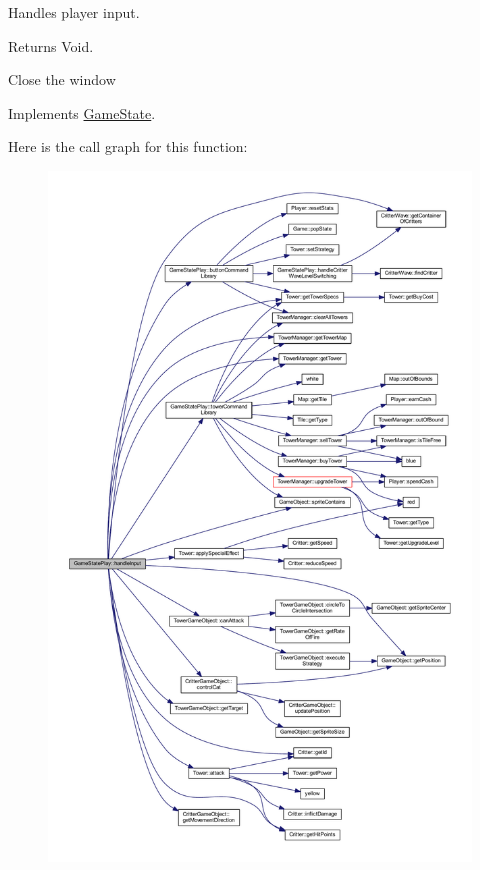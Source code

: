 Handles player input. 

\begin{DoxyReturn}{Returns}
Void. 
\end{DoxyReturn}
Close the window 

Implements \hyperlink{class_game_state_a970b55edd5a1da31ea0f7113e2c1f85a}{Game\+State}.



Here is the call graph for this function\+:
\nopagebreak
\begin{figure}[H]
\begin{center}
\leavevmode
\includegraphics[width=350pt]{class_game_state_play_ae9acc781e1fdbc931784ba3892c469ce_cgraph}
\end{center}
\end{figure}



